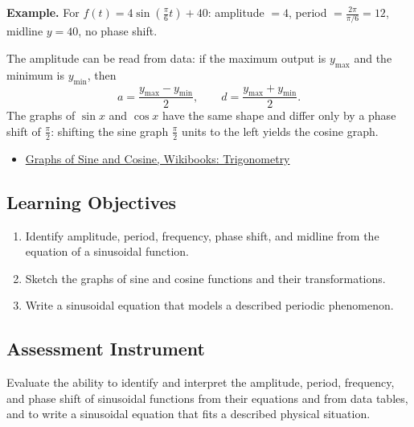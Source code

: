 \textbf{Example.} For $f(t) = 4\sin\!\left(\frac{\pi}{6}t\right) + 40$:
amplitude $= 4$, period $= \frac{2\pi}{\pi/6} = 12$, midline $y = 40$, no
phase shift.

The amplitude can be read from data: if the maximum output is $y_{\max}$ and
the minimum is $y_{\min}$, then
\[
  a = \frac{y_{\max} - y_{\min}}{2}, \qquad d = \frac{y_{\max} + y_{\min}}{2}.
\]
The graphs of $\sin x$ and $\cos x$ have the same shape and differ only by a
phase shift of $\frac{\pi}{2}$: shifting the sine graph $\frac{\pi}{2}$ units
to the left yields the cosine graph.

\begin{itemize}
  \item \href{https://en.wikibooks.org/wiki/Trigonometry/Graphs_of_Sine_and_Cosine_Functions}{Graphs of Sine and Cosine, Wikibooks: Trigonometry}
\end{itemize}

\subsection{Learning Objectives}
\label{ssec:lear-fe6e}

\begin{enumerate}
    \item Identify amplitude, period, frequency, phase shift, and midline from the equation of a sinusoidal function.
    \item Sketch the graphs of sine and cosine functions and their transformations.
    \item Write a sinusoidal equation that models a described periodic phenomenon.
\end{enumerate}

\subsection{Assessment Instrument}
\label{ssec:asse-3669}

Evaluate the ability to identify and interpret the amplitude, period, frequency, and phase
shift of sinusoidal functions from their equations and from data tables, and to write a
sinusoidal equation that fits a described physical situation.

